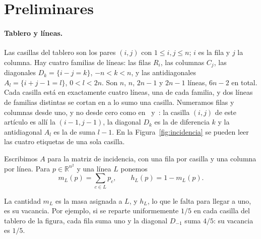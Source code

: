 \section{Preliminares}\label{sec:preliminares}

\paragraph{Tablero y líneas.}
Las casillas del tablero son los pares $(i,j)$ con $1\le i,j\le n$; $i$ es la fila y $j$ la columna.
Hay cuatro familias de líneas: las filas $R_i$, las columnas $C_j$, las diagonales
$D_k=\{i-j=k\}$, $-n<k<n$, y las antidiagonales $A_l=\{i+j-1=l\}$, $0<l<2n$. Son $n$, $n$,
$2n-1$ y $2n-1$ líneas, $6n-2$ en total. Cada casilla está en exactamente cuatro líneas, una de cada
familia, y dos líneas de familias distintas se cortan en a lo sumo una casilla.
Numeramos filas y columnas desde uno, y no desde cero como en~\cite{Perfil}
y~\cite{Completabilidad}: la casilla $(i,j)$ de este artículo es allí la $(i-1,j-1)$, la diagonal
$D_k$ es la de diferencia $k$ y la antidiagonal $A_l$ es la de suma $l-1$.
En la Figura~\ref{fig:incidencia} se pueden leer las cuatro etiquetas de una sola casilla.


Escribimos $A$ para la matriz de incidencia, con una fila por casilla y una columna por línea.
Para $p\in\mathbb R^{n^2}$ y una línea $L$ ponemos
\[
 m_L(p)=\sum_{c\in L}p_c,\qquad h_L(p)=1-m_L(p).
\]

La cantidad $m_L$ es la masa asignada a $L$, y $h_L$, lo que le falta para llegar a uno, es su vacancia.
Por ejemplo, si se reparte uniformemente $1/5$ en cada casilla del tablero de la figura, cada
fila suma uno y la diagonal $D_{-1}$ suma $4/5$: su vacancia es $1/5$.

